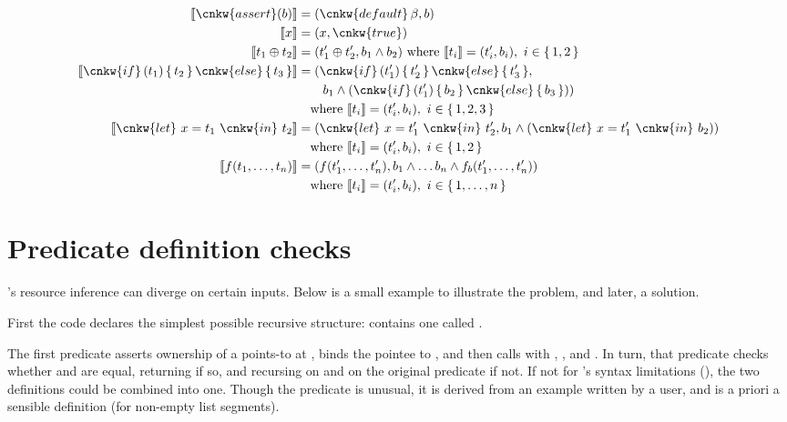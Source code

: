 {\small%
\begin{align*}
    \llbracket \cnkw{assert}(b) \rrbracket &= ( \cnkw{default}\,\beta, b ) \\
    \llbracket x \rrbracket &= ( x, \cnkw{true} ) \\
    \llbracket t_1 \oplus t_2 \rrbracket &= ( t'_1 \oplus t'_2 , b_1 \wedge b_2 )
    \ \text{where}\ \llbracket t_i \rrbracket = ( t'_i , b_i ),\ i \in \{\, 1, 2 \,\} \\
    \llbracket \cnkw{if}\, (t_1) \,\{\, t_2 \,\}\, \cnkw{else} \,\{\, t_3 \,\} \rrbracket &=
        (\cnkw{if}\, (t'_1) \,\{\, t'_2 \,\}\, \cnkw{else} \,\{\, t'_3 \,\}, \\
        & \qquad b_1 \wedge (\cnkw{if}\, (t'_1) \,\{\, b_2 \,\}\, \cnkw{else} \,\{\, b_3 \,\})) \\
        & \quad \text{where}\ \llbracket t_i \rrbracket = ( t'_i , b_i ),\ i \in \{\, 1, 2, 3 \,\} \\
    \llbracket \cnkw{let}\ x = t_1\ \cnkw{in}\ t_2 \rrbracket &=
    (\cnkw{let}\ x = t'_1\ \cnkw{in}\ t'_2, b_1 \wedge (\cnkw{let}\ x = t'_1\ \cnkw{in}\ b_2)) \\
        & \quad \text{where}\ \llbracket t_i \rrbracket = ( t'_i , b_i ),\ i \in \{\, 1, 2 \,\} \\
    \llbracket f (t_1, \ldots, t_n) \rrbracket &=
    (f (t'_1, \ldots, t'_n), b_1 \wedge \ldots b_n \wedge f_b (t'_1, \ldots, t'_n)) \\
        & \quad \text{where}\ \llbracket t_i \rrbracket = ( t'_i , b_i ),\ i \in \{\, 1, \ldots, n \,\} \\
\end{align*}}

\section{Predicate definition checks}

's resource inference can diverge on certain inputs. Below is a small
example to illustrate the problem, and later, a solution.


First the code declares the simplest possible recursive structure:
 contains one  called
.

The first predicate asserts ownership of a points-to at , binds
the pointee to , and then calls  with
, , and . In turn, that
predicate checks whether  and  are equal,
returning if so, and recursing on  and  on the
original predicate if not. If not for 's syntax limitations
(), the two definitions could be combined
into one. Though the predicate is unusual, it is derived from an example
written by a user, and is a priori a sensible
definition (for non-empty list segments).

